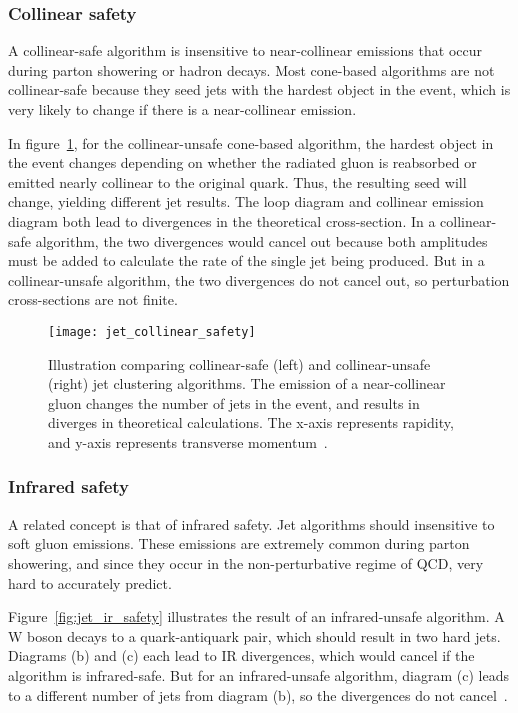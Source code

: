 \subsubsection{Collinear safety}

A collinear-safe algorithm is insensitive to near-collinear emissions that occur during parton showering or hadron decays.
Most cone-based algorithms are not collinear-safe because they seed jets with the hardest object in the event, which is very likely to change if there is a near-collinear emission.

In figure~\ref{fig:jet_collinear_safety}, for the collinear-unsafe cone-based algorithm, the hardest object in the event changes depending on whether the radiated gluon is reabsorbed or emitted nearly collinear to the original quark.
Thus, the resulting seed will change, yielding different jet results.
The loop diagram and collinear emission diagram both lead to divergences in the theoretical cross-section.
In a collinear-safe algorithm, the two divergences would cancel out because both amplitudes must be added to calculate the rate of the single jet being produced.
But in a collinear-unsafe algorithm, the two divergences do not cancel out, so perturbation cross-sections are not finite.

\begin{figure}[!ht]
    \centering
\texttt{[image: jet\_collinear\_safety]}
\caption{Illustration comparing collinear-safe (left) and collinear-unsafe (right) jet clustering algorithms.
The emission of a near-collinear gluon changes the number of jets in the event, and results in diverges in theoretical calculations.
The x-axis represents rapidity, and y-axis represents transverse momentum~\cite{jet-jetography}.}
\label{fig:jet_collinear_safety}
\end{figure}

\subsubsection{Infrared safety}

A related concept is that of infrared safety.
Jet algorithms should insensitive to soft gluon emissions.
These emissions are extremely common during parton showering, and since they occur in the non-perturbative regime of QCD,
very hard to accurately predict.

Figure~\ref{fig:jet_ir_safety} illustrates the result of an infrared-unsafe algorithm.
A W boson decays to a quark-antiquark pair, which should result in two hard jets.
Diagrams (b) and (c) each lead to IR divergences, which would cancel if the algorithm is infrared-safe.
But for an infrared-unsafe algorithm, diagram (c) leads to a different number of jets from diagram (b), so the divergences do not cancel~\cite{jet-jetography}.

